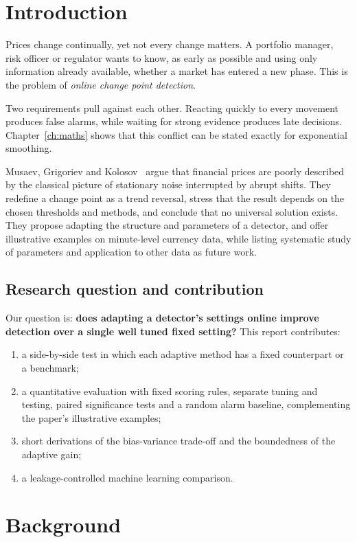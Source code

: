 \documentclass[12pt,a4paper]{report}
\theoremstyle{definition}\newtheorem{definition}{Definition}[chapter]
\begin{document}
\chapter{Introduction}
Prices change continually, yet not every change matters. A portfolio manager, risk officer or regulator wants to know, as early as possible and using only information already available, whether a market has entered a new phase. This is the problem of \emph{online change point detection}.

Two requirements pull against each other. Reacting quickly to every movement produces false alarms, while waiting for strong evidence produces late decisions. Chapter~\ref{ch:maths} shows that this conflict can be stated exactly for exponential smoothing.

Musaev, Grigoriev and Kolosov~\cite{musaev2024} argue that financial prices are poorly described by the classical picture of stationary noise interrupted by abrupt shifts. They redefine a change point as a trend reversal, stress that the result depends on the chosen thresholds and methods, and conclude that no universal solution exists. They propose adapting the structure and parameters of a detector, and offer illustrative examples on minute-level currency data, while listing systematic study of parameters and application to other data as future work.

\section*{Research question and contribution}
Our question is: \textbf{does adapting a detector's settings online improve detection over a single well tuned fixed setting?} This report contributes:
\begin{enumerate}
\item a side-by-side test in which each adaptive method has a fixed counterpart or a benchmark;
\item a quantitative evaluation with fixed scoring rules, separate tuning and testing, paired significance tests and a random alarm baseline, complementing the paper's illustrative examples;
\item short derivations of the bias-variance trade-off and the boundedness of the adaptive gain;
\item a leakage-controlled machine learning comparison.
\end{enumerate}

\chapter{Background}
\end{document}

